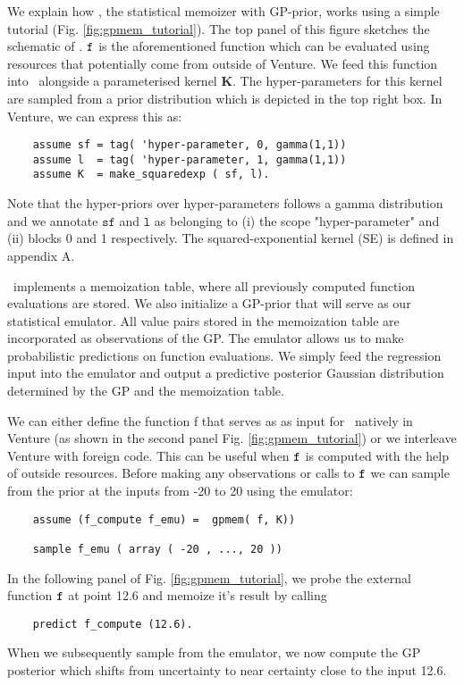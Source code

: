 We explain how \gpmem, the statistical memoizer with \ac{GP}-prior, works using a simple tutorial
(Fig. \ref{fig:gpmem_tutorial}). 
The top panel of this figure sketches the schematic of \gpmem.
$\texttt{f}$ is the aforementioned function which can be evaluated using resources that potentially come
from outside of Venture.  
We feed this function into \gpmem\ alongside
a parameterised kernel $\mathbf{K}$. The hyper-parameters for this kernel are sampled from a 
prior distribution which is depicted in the top right box. In Venture, we can express this as:
    \begin{lstlisting}
    assume sf = tag( 'hyper-parameter, 0, gamma(1,1)) 
    assume l  = tag( 'hyper-parameter, 1, gamma(1,1)) 
    assume K  = make_squaredexp ( sf, l).
    \end{lstlisting}
Note that the hyper-priors over hyper-parameters follows a gamma distribution and we annotate $\texttt{sf}$ and $\texttt{l}$
as belonging to (i) the scope "hyper-parameter" and (ii) blocks 0 and 1 respectively.
The squared-exponential kernel (SE) is defined in appendix A.

\gpmem\ implements a memoization table, where all previously
computed function evaluations are stored. We also initialize a \ac{GP}-prior that
will serve as our statistical emulator.
All value pairs stored in the memoization table are incorporated as observations of
the \ac{GP}.
The emulator allows us to make probabilistic predictions on function evaluations.
We simply feed the regression input
into the emulator and output a predictive posterior Gaussian distribution determined by the \ac{GP} and
the memoization table.

We can either define the function f that serves as as input for \gpmem\
 natively in Venture
(as shown in the second panel Fig. \ref{fig:gpmem_tutorial}) or we interleave Venture with foreign code. 
This can be useful when $\texttt{f}$ is computed with the help of outside resources.
Before making any observations or calls to $\texttt{f}$
we can sample from the prior at the inputs from -20 to 20 using the emulator:
    \begin{lstlisting}
    assume (f_compute f_emu) =  gpmem( f, K))

    sample f_emu ( array ( -20 , ..., 20 ))
    \end{lstlisting}
In the following panel of Fig. \ref{fig:gpmem_tutorial}, we probe the external function $\texttt{f}$ at point 12.6 and memoize it's result by calling 
   \begin{lstlisting}
    predict f_compute (12.6).
    \end{lstlisting}
When we subsequently sample from the emulator, we now compute the \ac{GP} posterior which shifts from uncertainty to near certainty close to the input 12.6.

